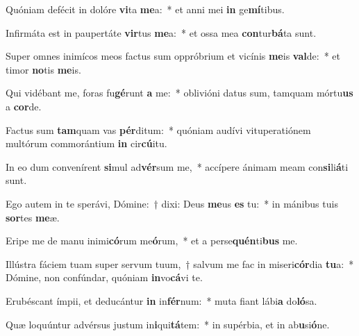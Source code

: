\item Quóniam defécit in dolóre \textbf{vi}ta \textbf{me}a:~* et anni mei \textbf{in} ge\textbf{mí}tibus.
\item Infirmáta est in paupertáte \textbf{vir}tus \textbf{me}a:~* et ossa mea \textbf{con}tur\textbf{bá}ta sunt.
\item Super omnes inimícos meos factus sum oppróbrium et vicínis \textbf{me}is \textbf{val}de:~* et timor \textbf{no}tis \textbf{me}is.
\item Qui vidébant me, foras fu\textbf{gé}runt \textbf{a} me:~* oblivióni datus sum, tamquam mórtu\textbf{us} a \textbf{cor}de.
\item Factus sum \textbf{tam}quam vas \textbf{pér}ditum:~* quóniam audívi vituperatiónem multórum commorántium \textbf{in} cir\textbf{cú}itu.
\item In eo dum convenírent \textbf{si}mul ad\textbf{vér}sum me,~* accípere ánimam meam con\textbf{si}li\textbf{á}ti sunt.
\item Ego autem in te sperávi, Dómine:~† dixi: Deus \textbf{me}us \textbf{es} tu:~* in mánibus tuis \textbf{sor}tes \textbf{me}æ.
\item Eripe me de manu inimi\textbf{có}rum me\textbf{ó}rum,~* et a perse\textbf{quén}ti\textbf{bus} me.
\item Illústra fáciem tuam super servum tuum,~† salvum me fac in miseri\textbf{cór}dia \textbf{tu}a:~* Dómine, non confúndar, quóniam \textbf{in}vo\textbf{cá}vi te.
\item Erubéscant ímpii, et deducántur \textbf{in} in\textbf{fér}num:~* muta fiant lábi\textbf{a} do\textbf{ló}sa.
\item Quæ loquúntur advérsus justum in\textbf{i}qui\textbf{tá}tem:~* in supérbia, et in ab\textbf{u}si\textbf{ó}ne.
